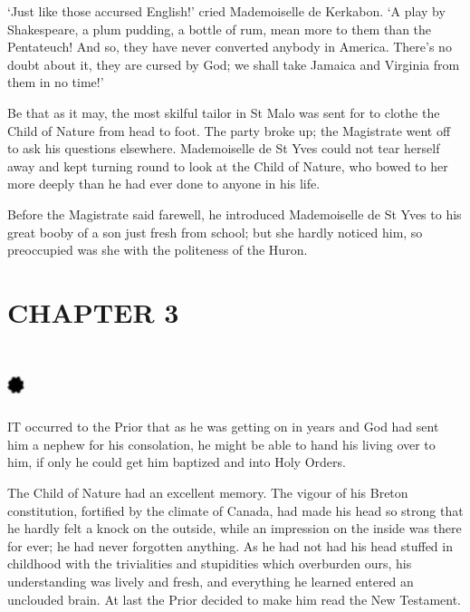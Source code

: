 \documentclass{article}
\begin{document}
\begin{center}
`Just like those accursed English!' cried Mademoiselle de Kerkabon. `A play by 
Shakespeare, a plum pudding, a bottle of rum, mean more to them than the Pentateuch! 
And so, they have never converted anybody in America. There's no doubt about it, 
they are cursed by God; we shall take Jamaica and Virginia from them in no time!' 

Be that as it may, the most skilful tailor in St Malo was sent for to clothe the 
Child of Nature from head to foot. The party broke up; the Magistrate went off 
to ask his questions elsewhere. Mademoiselle de St Yves could not tear herself 
away and kept turning round to look at the Child of Nature, who bowed to her more 
deeply than he had ever done to anyone in his life. 

Before the Magistrate said farewell, he introduced Mademoiselle de St Yves to his 
great booby of a son just fresh from school; but she hardly noticed him, so preoccupied 
was she with the politeness of the Huron.\pagebreak{} 

\section*{\textbf{CHAPTER 3  }}

\section*{%
\includegraphics[width=14pt, height=15pt, keepaspectratio=true]{Zadig or L'Ingenu - Voltaire-fig025.jpg}
}

 

IT occurred to the Prior that as he was getting on in years and God had sent him 
a nephew for his consolation, he might be able to hand his living over to him, 
if only he could get him baptized and into Holy Orders. 

The Child of Nature had an excellent memory. The vigour of his Breton constitution, 
fortified by the climate of Canada, had made his head so strong that he hardly 
felt a knock on the outside, while an impression on the inside was there for ever; 
he had never forgotten anything. As he had not had his head stuffed in childhood 
with the trivialities and stupidities which overburden ours, his understanding 
was lively and fresh, and everything he learned entered an unclouded brain. At 
last the Prior decided to make him read the New Testament. 


\end{center}
\end{document}
